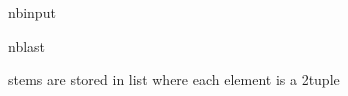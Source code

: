\documentclass[letterpaper,10pt,english]{sphinxmanual}
\begin{document}
\begin{sphinxuseclass}{nbinput}
\begin{sphinxuseclass}{nblast}
{
\begin{sphinxVerbatim}[commandchars=\\\{\}]
\llap{\color{nbsphinxin}[9]:\,\hspace{\fboxrule}\hspace{\fboxsep}}  
     \PYG{p}{[}\PYG{p}{]}
\end{sphinxVerbatim}
}

\end{sphinxuseclass}
\end{sphinxuseclass}
\sphinxAtStartPar
stems are stored in list where each element is a 2\sphinxhyphen{}tuple 
\end{document}
